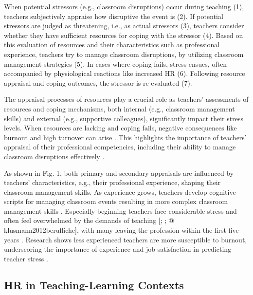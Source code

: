 \documentclass[preprint, 3p,
authoryear]{elsarticle} %
\begin{document}
When potential stressors (e.g., classroom disruptions) occur during
teaching (1), teachers subjectively appraise how disruptive the event is
(2). If potential stressors are judged as threatening, i.e., as actual
stressors (3), teachers consider whether they have sufficient resources
for coping with the stressor (4). Based on this evaluation of resources
and their characteristics such as professional experience, teachers try
to manage classroom disruptions, by utilizing classroom management
strategies (5). In cases where coping fails, stress ensues, often
accompanied by physiological reactions like increased HR (6). Following
resource appraisal and coping outcomes, the stressor is re-evaluated
(7).

The appraisal processes of resources play a crucial role as teachers'
assessments of resources and coping mechanisms, both internal (e.g.,
classroom management skills) and external (e.g., supportive colleagues),
significantly impact their stress levels. When resources are lacking and
coping fails, negative consequences like burnout and high turnover can
arise \citep{jalongo2006, unterbrink2007, aloe2014}. This highlights the
importance of teachers' appraisal of their professional competencies,
including their ability to manage classroom disruptions effectively
\citep{klieme2008concept, konig2016teacher}.

As shown in Fig. 1, both primary and secondary appraisals are influenced
by teachers' characteristics, e.g., their professional experience,
shaping their classroom management skills. As experience grows, teachers
develop cognitive scripts for managing classroom events resulting in
more complex classroom management skills \citep{wolff2021classroom}.
Especially beginning teachers face considerable stress and often feel
overwhelmed by the demands of teaching
{[}\citet{ophardt2017klassenmanagement}; \citet{wolff2015keeping}; @
klusmann2012berufliche{]}, with many leaving the profession within the
first five years \citep{ingersoll2003}. Research shows less experienced
teachers are more susceptible to burnout, underscoring the importance of
experience and job satisfaction in predicting teacher stress
\citep{fisher2011}.

\subsection{HR in Teaching-Learning
Contexts}\label{hr-in-teaching-learning-contexts}
\end{document}
